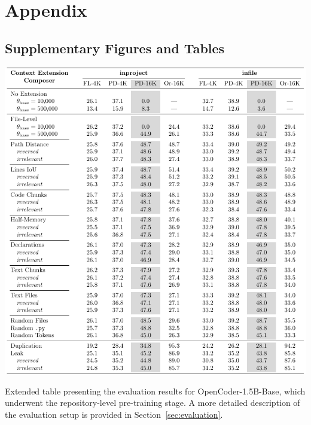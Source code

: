 \chapter{Appendix}

\section{Supplementary Figures and Tables}

\begin{table}[htbp]
    \centering
    \includegraphics[width=\textwidth]{tables/rq-b.pdf}
    \caption{Extended table presenting the evaluation results for OpenCoder-1.5B-Base, which underwent the repository-level pre-training stage. A more detailed description of the evaluation setup is provided in Section~\ref{sec:evaluation}.}\label{tab:ocoder-extension-extended}
\end{table}

